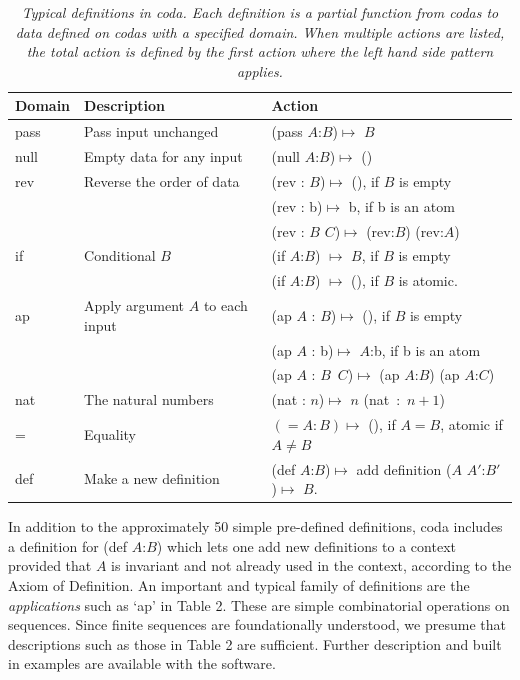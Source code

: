 \documentclass[11pt]{article}
\begin{document}
\begin{table}
\begin{tabular}{ | l | l | l | }
Domain & Description & Action \\
\hline
pass & Pass input unchanged & (pass $A$:$B$)$\mapsto$ $B$ \\
\hline
null & Empty data for any input & (null $A$:$B$)$\mapsto$ () \\
\hline
rev & Reverse the order of data & (rev : $B$)$\mapsto$ (), if $B$ is empty \\
 &  & (rev : b)$\mapsto$ b, if b is an atom \\
 & & (rev : $B$ $C$)$\mapsto$ (rev:$B$) (rev:$A$) \\
 \hline
 if & Conditional $B$ & (if $A$:$B$) $\mapsto$ $B$, if $B$ is empty \\
 & & (if $A$:$B$) $\mapsto$ (), if $B$ is atomic. \\
 \hline
 ap & Apply argument $A$ to each input & (ap $A$ : $B$)$\mapsto$ (), if $B$ is empty \\
  & & (ap $A$ : b)$\mapsto$ $A$:b, if b is an atom \\
  & & (ap $A$ : $B$\ $C$)$\mapsto$ (ap $A$:$B$) (ap $A$:$C$) \\
\hline
nat & The natural numbers & (nat : $n$)$\mapsto$ $n$ (nat\ :\ $n+1$) \\
\hline
= & Equality & $(=A:B)\mapsto$ (), if $A=B$, atomic if $A\neq B$ \\
\hline
def & Make a new definition & (def $A$:$B$)$\mapsto$ add definition ($A$ $A'$:$B'$)$\mapsto$ $B$. \\
\hline
\end{tabular}
\caption{\label{ }{\it Typical definitions in coda.  Each definition is a partial function from codas to data defined on
codas with a specified domain.  When multiple actions are listed, the total action is defined by the first action
where the left hand side pattern applies.}}
\end{table}
In addition to the approximately 50 simple pre-defined definitions, coda includes a definition for (def $A$:$B$) which lets one
add new definitions to a context provided that $A$ is invariant and not already used in the context, according to the Axiom of Definition.
An important and typical family of definitions are the {\it applications} such as `ap' in Table 2.  These
are simple combinatorial operations on sequences.  Since finite sequences are foundationally understood, we presume that descriptions
such as those in Table 2 are sufficient.  Further description and built in examples are available with the software\cite{github}.
\end{document}
